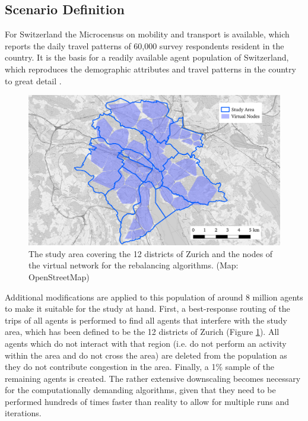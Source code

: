 
\subsection{Scenario Definition}

For Switzerland the Microcensus on mobility and transport \cite{microcensus} is
available, which reports the daily travel patterns of 60,000 survey respondents
resident in the country.
It is the basis for a readily available agent population of
Switzerland, which reproduces the demographic attributes and travel patterns
in the country to great detail \cite{ivtbaseline}.

\begin{figure}[h]
\begin{center}\includegraphics[width=1.0\textwidth]{figures/map.pdf}\end{center}
\caption{The study area covering the 12 districts of Zurich and the nodes of the
virtual network for the rebalancing algorithms. (Map: OpenStreetMap)}
\label{fig:study_area_vnodes}
\end{figure}

Additional modifications are applied to this population of around 8 million
agents to make it suitable for the study at hand. First, a best-response routing
of the trips of all agents is performed to find all agents that interfere
with the study area, which has been defined to be the 12 districts of Zurich (Figure \ref{fig:study_area_vnodes}).
All agents which do not interact with that region (i.e. do not perform an activity within
the area and do not cross the area) are deleted from the population as they do
not contribute congestion in the area. Finally, a 1\%
sample of the remaining agents is created. The rather extensive downscaling becomes necessary for the computationally
demanding algorithms, given that they need to be performed hundreds of times faster
than reality to allow for multiple runs and iterations.

